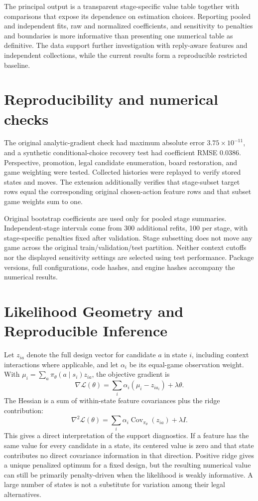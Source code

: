 \documentclass{jcst}
\begin{document}
The principal output is a transparent stage-specific value table together with comparisons that expose its dependence on estimation choices. Reporting pooled and independent fits, raw and normalized coefficients, and sensitivity to penalties and boundaries is more informative than presenting one numerical table as definitive. The data support further investigation with reply-aware features and independent collections, while the current results form a reproducible restricted baseline.

\appendix
\section{Reproducibility and numerical checks}
The original analytic-gradient check had maximum absolute error $3.75\times10^{-11}$, and a synthetic conditional-choice recovery test had coefficient RMSE 0.0386. Perspective, promotion, legal candidate enumeration, board restoration, and game weighting were tested. Collected histories were replayed to verify stored states and moves. The extension additionally verifies that stage-subset target rows equal the corresponding original chosen-action feature rows and that subset game weights sum to one.

Original bootstrap coefficients are used only for pooled stage summaries. Independent-stage intervals come from 300 additional refits, 100 per stage, with stage-specific penalties fixed after validation. Stage subsetting does not move any game across the original train/validation/test partition. Neither context cutoffs nor the displayed sensitivity settings are selected using test performance. Package versions, full configurations, code hashes, and engine hashes accompany the numerical results.

\section{Likelihood Geometry and Reproducible Inference}
Let $z_{ia}$ denote the full design vector for candidate $a$ in state $i$, including context interactions where applicable, and let $\alpha_i$ be its equal-game observation weight. With $\mu_i=\sum_a\pi_\theta(a\mid s_i)z_{ia}$, the objective gradient is
\begin{equation}
\nabla\mathcal L(\theta)=\sum_i\alpha_i(\mu_i-z_{ia_i})+\lambda\theta.
\end{equation}
The Hessian is a sum of within-state feature covariances plus the ridge contribution:
\begin{equation}
\nabla^2\mathcal L(\theta)=\sum_i\alpha_i\operatorname{Cov}_{\pi_\theta}(z_{ia})+\lambda I.
\end{equation}
This gives a direct interpretation of the support diagnostics. If a feature has the same value for every candidate in a state, its centered value is zero and that state contributes no direct covariance information in that direction. Positive ridge gives a unique penalized optimum for a fixed design, but the resulting numerical value can still be primarily penalty-driven when the likelihood is weakly informative. A large number of states is not a substitute for variation among their legal alternatives.
\end{document}
